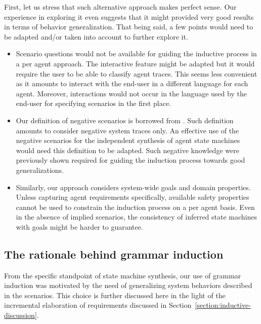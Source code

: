 First, let us stress that such alternative approach makes perfect sense. Our experience in exploring it even suggests that it might provided very good results in terms of behavior generalization. That being said, a few points would need to be adapted and/or taken into account to further explore it.
\begin{itemize}
\item Scenario questions would not be available for guiding the inductive process in a per agent approach. The interactive feature might be adapted but it would require the user to be able to classify agent traces. This seems less convenient as it amounts to interact with the end-user in a different language for each agent. Moreover, interactions would not occur in the language used by the end-user for specifying scenarios in the first place. 
\item Our definition of negative scenarios is borrowed from \cite{Uchitel:2002}. Such definition amounts to consider negative system traces only. An effective use of the negative scenarios for the independent synthesis of agent state machines would need this definition to be adapted. Such negative knowledge were previously shown required for guiding the induction process towards good generalizations.
\item Similarly, our approach considers system-wide goals and domain properties. Unless capturing agent requirements specifically, available safety properties cannot be used to constrain the induction process on a per agent basis. Even in the absence of implied scenarios, the consistency of inferred state machines with goals might be harder to guarantee.
\end{itemize}

\subsection{The rationale behind grammar induction\label{subsection:grammar-induction-rationale}}

From the specific standpoint of state machine synthesis, our use of grammar induction was motivated by the need of generalizing system behaviors described in the scenarios. This choice is further discussed here in the light of the incremental elaboration of requirements discussed in Section~\ref{section:inductive-discussion}.

